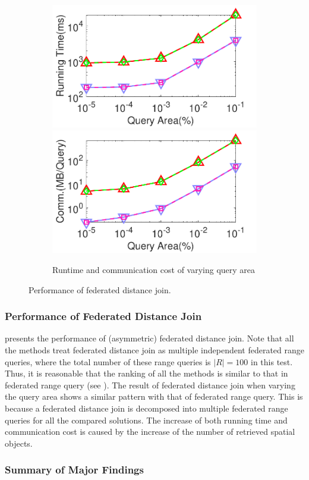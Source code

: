 \begin{figure}[t]
    \begin{subfigure}{0.48\textwidth}
        \centering
        \includegraphics[width=0.48\linewidth]{dj_area_time.pdf}
        \includegraphics[width=0.48\linewidth]{dj_area_cost.pdf}
        \caption{Runtime and communication cost of varying query area}
        \label{fig:djoin-eff-r-n}
    \end{subfigure}
    \caption{Performance of federated distance join.}
    \label{fig:dis-join-eff}
\end{figure}

\subsubsection{Performance of Federated Distance Join}
\label{sec:exp-asym-rqj}

 presents the performance of (asymmetric) federated distance join. 
Note that all the methods treat federated distance join as multiple independent federated range queries, where the total number of these range queries is $|R|=100$ in this test.
Thus, it is reasonable that the ranking of all the methods is similar to that in federated range query (see ).
The result of federated distance join when varying the query area shows a similar pattern with that of federated range query. 
This is because a federated distance join is decomposed into multiple federated range queries for all the compared solutions.
The increase of both running time and communication cost is caused by the increase of the number of retrieved spatial objects.

\subsubsection{Summary of Major Findings}
\label{sec:exp-asym-summary}

